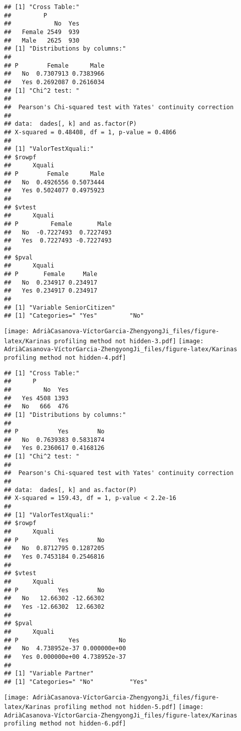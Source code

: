 \documentclass[
]{article}
\begin{document}
\begin{verbatim}
## [1] "Cross Table:"
##         P
##            No  Yes
##   Female 2549  939
##   Male   2625  930
## [1] "Distributions by columns:"
##      
## P        Female      Male
##   No  0.7307913 0.7383966
##   Yes 0.2692087 0.2616034
## [1] "Chi^2 test: "
## 
##  Pearson's Chi-squared test with Yates' continuity correction
## 
## data:  dades[, k] and as.factor(P)
## X-squared = 0.48408, df = 1, p-value = 0.4866
## 
## [1] "ValorTestXquali:"
## $rowpf
##      Xquali
## P        Female      Male
##   No  0.4926556 0.5073444
##   Yes 0.5024077 0.4975923
## 
## $vtest
##      Xquali
## P         Female       Male
##   No  -0.7227493  0.7227493
##   Yes  0.7227493 -0.7227493
## 
## $pval
##      Xquali
## P       Female     Male
##   No  0.234917 0.234917
##   Yes 0.234917 0.234917
## 
## [1] "Variable SeniorCitizen"
## [1] "Categories=" "Yes"         "No"
\end{verbatim}

\texttt{[image: AdriàCasanova-VíctorGarcia-ZhengyongJi\_files/figure-latex/Karinas profiling method not hidden-3.pdf]}
\texttt{[image: AdriàCasanova-VíctorGarcia-ZhengyongJi\_files/figure-latex/Karinas profiling method not hidden-4.pdf]}

\begin{verbatim}
## [1] "Cross Table:"
##      P
##         No  Yes
##   Yes 4508 1393
##   No   666  476
## [1] "Distributions by columns:"
##      
## P           Yes        No
##   No  0.7639383 0.5831874
##   Yes 0.2360617 0.4168126
## [1] "Chi^2 test: "
## 
##  Pearson's Chi-squared test with Yates' continuity correction
## 
## data:  dades[, k] and as.factor(P)
## X-squared = 159.43, df = 1, p-value < 2.2e-16
## 
## [1] "ValorTestXquali:"
## $rowpf
##      Xquali
## P           Yes        No
##   No  0.8712795 0.1287205
##   Yes 0.7453184 0.2546816
## 
## $vtest
##      Xquali
## P           Yes        No
##   No   12.66302 -12.66302
##   Yes -12.66302  12.66302
## 
## $pval
##      Xquali
## P              Yes           No
##   No  4.738952e-37 0.000000e+00
##   Yes 0.000000e+00 4.738952e-37
## 
## [1] "Variable Partner"
## [1] "Categories=" "No"          "Yes"
\end{verbatim}

\texttt{[image: AdriàCasanova-VíctorGarcia-ZhengyongJi\_files/figure-latex/Karinas profiling method not hidden-5.pdf]}
\texttt{[image: AdriàCasanova-VíctorGarcia-ZhengyongJi\_files/figure-latex/Karinas profiling method not hidden-6.pdf]}
\end{document}

